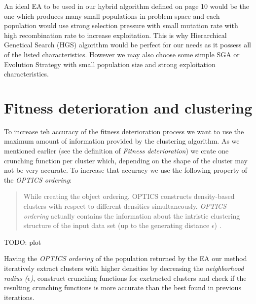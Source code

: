 An ideal EA to be used in our hybrid algorithm defined on page 10
would be the one which produces many small populations in problem space and
each population would use strong selection pressure with small mutation rate
with high recombination rate to increase exploitation. This is why Hierarchical 
Genetical Search (HGS) algorithm would be perfect for our needs as it possess
all of the listed characteristics. However we may also choose some simple 
SGA or Evolution Strategy with small population size and strong exploitation
characteristics.
 

\section{Fitness deterioration and clustering}

To increase teh accuracy of the fitness deterioration process 
we want to use the maximum amount of information provided by the clustering
algorithm. As we mentioned earlier (see the definition of \textit{Fitness
deterioration}) we crate one crunching function per cluster which, depending
on the shape of the cluster may not be very accurate. To increase that accuracy
we use the following property of the \textit{OPTICS ordering}:
\begin{quotation}
While creating the object ordering, OPTICS constructs density-based clusters
with respect to different densities simultaneously. \textit{OPTICS ordering}
actually contains the information about the intristic clustering structure of
the input data set (up to the generating distance $\epsilon$) \cite{optics}.
\end{quotation}

TODO: plot

Having the \textit{OPTICS ordering} of the population returned by the EA our
method iteratively extract clusters with higher densities by decreasing 
the \textit{neighborhood radius ($\epsilon$)}, construct crunching functions
for exctracted clusters and check if the resulting crunching functions 
is more accurate than the best found in previous iterations. 

\begin{algorithmic}[1]
	\ENDIF
\ENDWHILE
\end{algorithmic}

